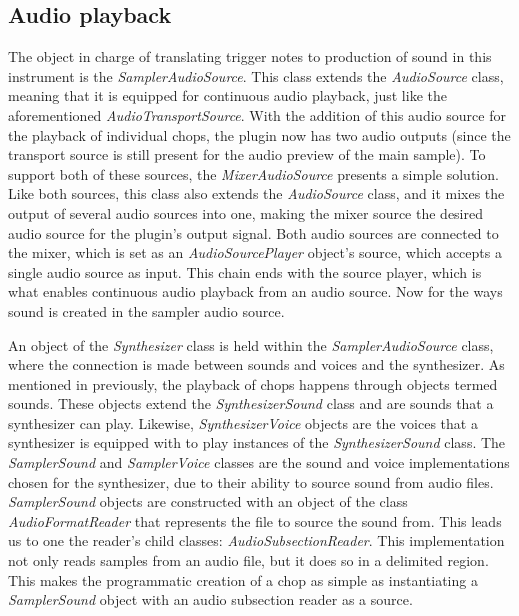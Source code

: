 \documentclass[12pt, a4paper, hidelinks]{article}
\begin{document}
	
	
	\newpage
	\subsection{Audio playback}
	The object in charge of translating trigger notes to production of sound in this instrument is the \textit{SamplerAudioSource}. This class extends the \textit{AudioSource} class, meaning that it is equipped for continuous audio playback, just like the aforementioned \textit{AudioTransportSource}. With the addition of this audio source for the playback of individual chops, the plugin now has two audio outputs (since the transport source is still present for the audio preview of the main sample). To support both of these sources, the \textit{MixerAudioSource} presents a simple solution. Like both sources, this class also extends the \textit{AudioSource} class, and it mixes the output of several audio sources into one, making the mixer source the desired audio source for the plugin's output signal. Both audio sources are connected to the mixer, which is set as an \textit{AudioSourcePlayer} object's source, which accepts a single audio source as input. This chain ends with the source player, which is what enables continuous audio playback from an audio source. Now for the ways sound is created in the sampler audio source. \par
	
	An object of the \textit{Synthesizer} class is held within the \textit{SamplerAudioSource} class, where the connection is made between sounds and voices and the synthesizer. As mentioned in previously, the playback of chops happens through objects termed sounds. These objects extend the \textit{SynthesizerSound} class and are sounds that a synthesizer can play. Likewise, \textit{SynthesizerVoice} objects are the voices that a synthesizer is equipped with to play instances of the \textit{SynthesizerSound} class. The \textit{SamplerSound} and \textit{SamplerVoice} classes are the sound and voice implementations chosen for the synthesizer, due to their ability to source sound from audio files. \textit{SamplerSound} objects are constructed with an object of the class \textit{AudioFormatReader} that represents the file to source the sound from. This leads us to one the reader's child classes: \textit{AudioSubsectionReader}. This implementation not only reads samples from an audio file, but it does so in a delimited region. This makes the programmatic  creation of a chop as simple as instantiating a \textit{SamplerSound} object with an audio subsection reader as a source. \par
	
\end{document}

